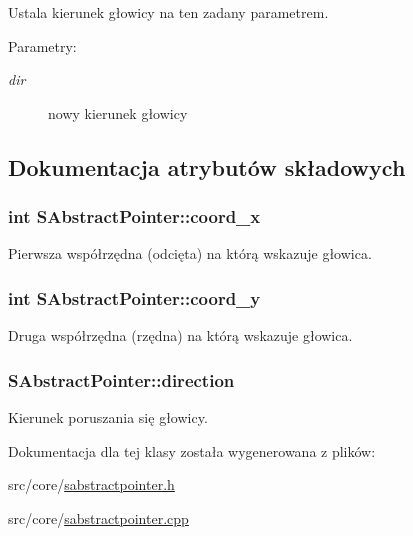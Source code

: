 Ustala kierunek głowicy na ten zadany parametrem. \begin{Desc}
\item[Parametry:]
\begin{description}
\item[{\em dir}]nowy kierunek głowicy \end{description}
\end{Desc}


\subsection{Dokumentacja atrybutów składowych}
\hypertarget{classSAbstractPointer_f4a22efc5fe4922cfe61ac8d849d6849}{
\subsubsection[{coord\_\-x}]{\setlength{\rightskip}{0pt plus 5cm}int {\bf SAbstractPointer::coord\_\-x}}}
\label{classSAbstractPointer_f4a22efc5fe4922cfe61ac8d849d6849}


Pierwsza współrzędna (odcięta) na którą wskazuje głowica. \hypertarget{classSAbstractPointer_8804aa2589dc17c401c438a2f4a1c489}{
\subsubsection[{coord\_\-y}]{\setlength{\rightskip}{0pt plus 5cm}int {\bf SAbstractPointer::coord\_\-y}}}
\label{classSAbstractPointer_8804aa2589dc17c401c438a2f4a1c489}


Druga współrzędna (rzędna) na którą wskazuje głowica. \hypertarget{classSAbstractPointer_6e8b50c6806f43a8b29596c8899db4f2}{
\subsubsection[{direction}]{ {\bf SAbstractPointer::direction}}}
\label{classSAbstractPointer_6e8b50c6806f43a8b29596c8899db4f2}


Kierunek poruszania się głowicy. 

Dokumentacja dla tej klasy została wygenerowana z plików:\begin{CompactItemize}
\item 
src/core/\hyperlink{sabstractpointer_8h}{sabstractpointer.h}\item 
src/core/\hyperlink{sabstractpointer_8cpp}{sabstractpointer.cpp}\end{CompactItemize}
